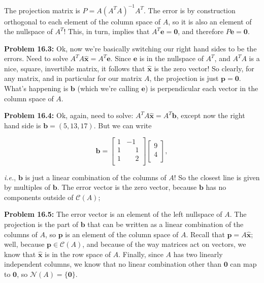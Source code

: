 \documentclass{article}
\begin{document}
The projection matrix is $P = A(A^{T}A)^{-1}A^{T}$. The error is by construction orthogonal to each element of the column space of $A$, so it is also an element of the nullspace of $A^{T}$! This, in turn, implies that $A^{T}\mathbf{e = 0}$, and therefore $P\mathbf{e = 0}$.

\noindent \textbf{Problem 16.3:} Ok, now we're basically switching our right hand sides to be the errors. Need to solve $A^{T}A\widehat{\mathbf{x}} = A^{T}\mathbf{e}$. Since $\mathbf{e}$ is in the nullspace of $A^{T}$, and $A^{T}A$ is a nice, square, invertible matrix, it follows that $\widehat{\mathbf{x}}$ is the zero vector! So clearly, for any matrix, and in particular for our matrix $A$, the projection is just $\mathbf{p = 0}$. What's happening is $\mathbf{b}$ (which we're calling $\mathbf{e}$) is perpendicular each vector in the column space of $A$.

\noindent \textbf{Problem 16.4:} Ok, again, need to solve: $A^{T}A\widehat{\mathbf{x}} = A^{T}\mathbf{b}$, except now the right hand side is $\mathbf{b} = (5, 13, 17)$. But we can write

\[
\mathbf{b} = \begin{bmatrix}
1 & -1\\
1 & \phantom{-}1\\
1 & \phantom{-}2\\
\end{bmatrix}
\begin{bmatrix}
9\\
4\\
\end{bmatrix},
\]

\textit{i.e.}, $\mathbf{b}$ is just a linear combination of the columns of $A$! So the closest line is given by multiples of $\mathbf{b}$. The error vector is the zero vector, because $\mathbf{b}$ has no components outside of $\mathcal{C}(A)$;

\noindent \textbf{Problem 16.5:} The error vector is an element of the left nullspace of $A$. The projection is the part of $\mathbf{b}$ that can be written as a linear combination of the columns of $A$, so $\mathbf{p}$ is an element of the column space of $A$. Recall that $\mathbf{p} = A\widehat{\mathbf{x}}$; well, because $\mathbf{p} \in \mathcal{C}(A)$, and because of the way matrices act on vectors, we know that $\widehat{\mathbf{x}}$ is in the row space of $A$. Finally, since $A$ has two linearly independent columns, we know that no linear combination other than $\mathbf{0}$ can map to $\mathbf{0}$, so $\mathcal{N}(A) = \{\mathbf{0}\}$.
\end{document}
